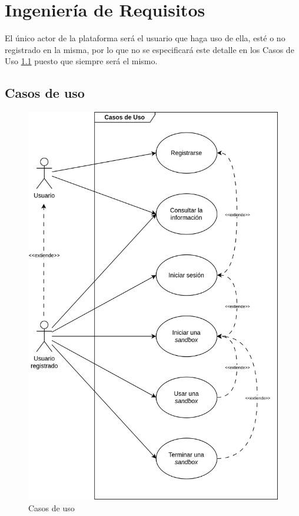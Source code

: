     \section{Ingeniería de Requisitos}
        \label{cap:ingenieria-requisitos}
        
        
        
        El único actor de la plataforma será el usuario que haga uso de ella, esté o no registrado en la misma, por lo que no se especificará este detalle en los Casos de Uso \ref{sec:casos-uso} puesto que siempre será el mismo.
        
        
        \subsection{Casos de uso}
            \label{sec:casos-uso}
            
            \begin{figure}[h]
                \centering
                \includegraphics[scale=0.125]{images/Diagramas/Casos de uso.png}
                \caption{Casos de uso}
                \label{fig:casos-uso}
            \end{figure}
            
